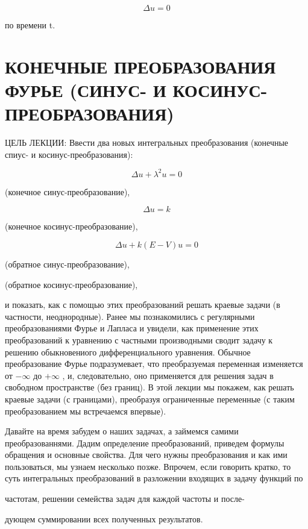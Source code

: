 \documentclass[
]{article}
\begin{document}
\[
\Delta u = 0
\]

по времени t.

\section{КОНЕЧНЫЕ ПРЕОБРАЗОВАНИЯ ФУРЬЕ (СИНУС- И
КОСИНУС-ПРЕОБРАЗОВАНИЯ)}\label{ux43aux43eux43dux435ux447ux43dux44bux435-ux43fux440ux435ux43eux431ux440ux430ux437ux43eux432ux430ux43dux438ux44f-ux444ux443ux440ux44cux435-ux441ux438ux43dux443ux441--ux438-ux43aux43eux441ux438ux43dux443ux441-ux43fux440ux435ux43eux431ux440ux430ux437ux43eux432ux430ux43dux438ux44f}

ЦЕЛЬ ЛЕКЦИИ: Ввести два новых интегральных преобразования (конечные
спиус- и косинус-преобразования):

\[
\Delta u + \lambda^2 u = 0
\]

(конечное синус-преобразование),

\[
\Delta u = k
\]

(конечное косинус-преобразование),

\[
\Delta u + k(E - V)u = 0
\]

(обратное синус-преобразование),

(обратное косинус-преобразование),

и показать, как с помощью этих преобразований решать краевые задачи (в
частности, неоднородные). Ранее мы познакомились с регулярными
преобразованиями Фурье и Лапласа и увидели, как применение этих
преобразований к уравнению с частными производными сводит задачу к
решению обыкновениого дифференциального уравнения. Обычное
преобразование Фурье подразумевает, что преобразуемая переменная
изменяется от \(-\infty\) до \(+\infty\) , и, следовательно, оно
применяется для решения задач в свободном пространстве (без границ). В
этой лекции мы покажем, как решать краевые задачи (с границами),
преобразуя ограниченные переменные (с таким преобразованием мы
встречаемся впервые).

Давайте на время забудем о наших задачах, а займемся самими
преобразованнями. Дадим определение преобразований, приведем формулы
обращения и основные свойства. Для чего нужны преобразования и как ими
пользоваться, мы узнаем несколько позже. Впрочем, если говорить кратко,
то суть интегральных преобразований в разложении входящих в задачу
функций по

частотам, решении семейства задач для каждой частоты и после-

дующем суммировании всех полученных результатов.
\end{document}

